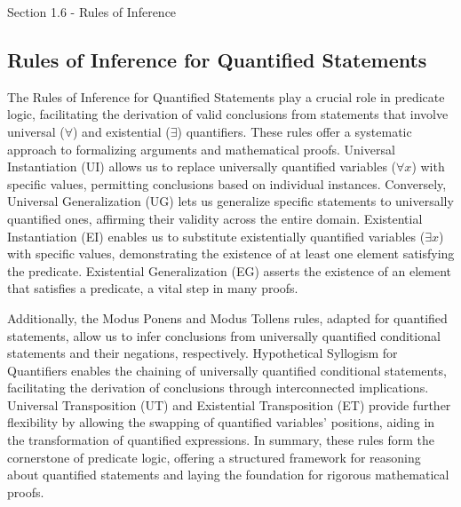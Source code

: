 \begin{notes}{Section 1.6 - Rules of Inference}
    \subsection*{Rules of Inference for Quantified Statements}

    The Rules of Inference for Quantified Statements play a crucial role in predicate logic, facilitating the derivation of valid conclusions from statements that involve universal (\(\forall\)) and 
    existential (\(\exists\)) quantifiers. These rules offer a systematic approach to formalizing arguments and mathematical proofs. Universal Instantiation (UI) allows us to replace universally quantified 
    variables (\(\forall x\)) with specific values, permitting conclusions based on individual instances. Conversely, Universal Generalization (UG) lets us generalize specific statements to universally 
    quantified ones, affirming their validity across the entire domain. Existential Instantiation (EI) enables us to substitute existentially quantified variables (\(\exists x\)) with specific values, 
    demonstrating the existence of at least one element satisfying the predicate. Existential Generalization (EG) asserts the existence of an element that satisfies a predicate, a vital step in many proofs.
    
    Additionally, the Modus Ponens and Modus Tollens rules, adapted for quantified statements, allow us to infer conclusions from universally quantified conditional statements and their negations, respectively. 
    Hypothetical Syllogism for Quantifiers enables the chaining of universally quantified conditional statements, facilitating the derivation of conclusions through interconnected implications. Universal Transposition 
    (UT) and Existential Transposition (ET) provide further flexibility by allowing the swapping of quantified variables' positions, aiding in the transformation of quantified expressions. In summary, these rules 
    form the cornerstone of predicate logic, offering a structured framework for reasoning about quantified statements and laying the foundation for rigorous mathematical proofs.    


\end{notes}
